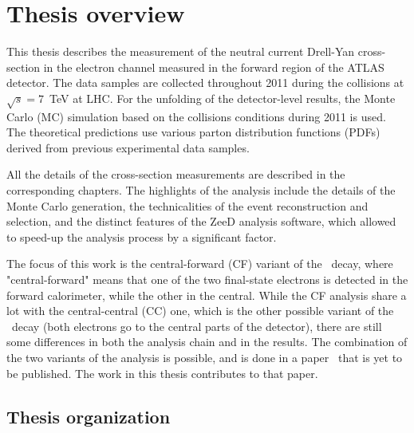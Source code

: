 \chapter{Thesis overview}
\label{sec:TOverview}

This thesis describes the measurement of the neutral current Drell-Yan cross-section in the electron channel measured in the forward region of the ATLAS detector. The data samples are collected throughout 2011 during the collisions at $\sqrt{s} = 7$~TeV at LHC. For the unfolding of the detector-level results, the Monte Carlo (MC) simulation based on the collisions conditions during 2011 is used. The theoretical predictions use various parton distribution functions (PDFs) derived from previous experimental data samples.

All the details of the cross-section measurements are described in the corresponding chapters. The highlights of the analysis include the details of the Monte Carlo generation, the technicalities of the event reconstruction and selection, and the distinct features of the ZeeD analysis software, which allowed to speed-up the analysis process by a significant factor.

The focus of this work is the central-forward (CF) variant of the \Zee\ decay, where "central-forward" means that one of the two final-state electrons is detected in the forward calorimeter, while the other in the central. While the CF analysis share a lot with the central-central (CC) one, which is the other possible variant of the \Zee\ decay (both electrons go to the central parts of the detector), there are still some differences in both the analysis chain and in the results. The combination of the two variants of the analysis is possible, and is done in a paper~\cite{lib:wz2011} that is yet to be published. The work in this thesis contributes to that paper.


\section{Thesis organization}
\label{sec:TOrganization}

